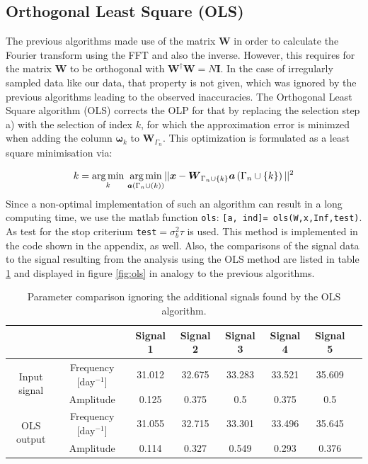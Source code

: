 
\subsection{Orthogonal Least Square (OLS)}
The previous algorithms made use of the matrix $\boldsymbol{W}$ in order to calculate the Fourier transform using the FFT and also the inverse. However, this requires for the matrix $\boldsymbol{W}$ to be orthogonal with $\boldsymbol{W}^{\dag}\boldsymbol{W}=N\boldsymbol{I}$. In the case of irregularly sampled data like our data, that property is not given, which was ignored by the previous algorithms leading to the observed inaccuracies. The Orthogonal Least Square algorithm (OLS) corrects the OLP for that by replacing the selection step a) with the selection of index $k$, for which the approximation error is minimzed when adding the column $\boldsymbol{\omega}_{k}$ to $\boldsymbol{W}_{\Gamma_{n}}$. This optimization is formulated as a least square minimisation via:

\begin{equation*}
k=\underset{k}{\operatorname*{arg\,min}}\text{ } \underset{\boldsymbol{a}\left(\Gamma_{n}\cup\left(k\right)\right)}{\operatorname*{arg\,min}} ||\boldsymbol{x} - \boldsymbol{W}_{\Gamma_{n}\cup \{k\}}\boldsymbol{a}\left( \Gamma_{n}\cup \{k\}\right)  ||^{2}
\end{equation*}
Since a non-optimal implementation of such an algorithm can result in a long computing time, we use the matlab function \texttt{ols}: \texttt{[a, ind]= ols(W,x,Inf,test)}. As test for the stop criterium \texttt{test}$=\sigma_{b}^{2}\tau$  is used. This method is implemented in the code shown in the appendix, as well. Also, the comparisons of the signal data to the signal resulting from the analysis using the OLS method are listed in table \ref{tab:ols} and displayed in figure \ref{fig:ols} in analogy to the previous algorithms. 

\begin{table}[h!]
\centering
\begin{tabular}{ | c| c| c| c| c| c|c|c| }
\hline
	&   & Signal 1 & Signal 2 & Signal 3 & Signal 4 & Signal 5 \\ \hline
\multirow{2}{3cm}{Input signal} & Frequency [day$^{-1}$] & 31.012 & 32.675 & 33.283 & 33.521 & 35.609 \\ \cline{2-7}
 & Amplitude & 0.125 & 0.375 & 0.5 & 0.375 & 0.5 \\ \hline

\multirow{2}{3cm}{OLS output} & Frequency [day$^{-1}$] &31.055  & 32.715 & 33.301 & 33.496  & 35.645  \\ \cline{2-7}
 & Amplitude & 0.114 & 0.327 & 0.549  & 0.293  & 0.376 \\ \hline

\end{tabular}
\caption{Parameter comparison ignoring the additional signals found by the OLS algorithm.}
\label{tab:ols}
\end{table}

